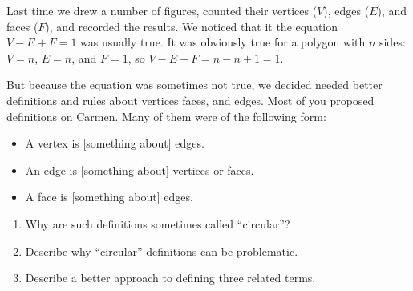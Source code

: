 \documentclass{ximera}
\begin{document}
\begin{question}
Last time we drew a number of figures, counted their vertices ($V$), edges ($E$), and faces ($F$), and recorded the results.  We noticed that it the equation $V-E+F=1$ was usually true.  It was obviously true for a polygon with $n$ sides: $V=n$, $E=n$, and $F=1$, so $V-E+F=n-n+1=1$.  

But because the equation was sometimes not true, we decided needed better definitions and rules about vertices faces, and edges.  Most of you proposed definitions on Carmen.  Many of them were of the following form: 
\begin{itemize}
\item A vertex is [something about] edges. 
\item An edge is [something about] vertices or faces. 
\item A face is [something about] edges. 
\end{itemize}
\begin{enumerate}
\item Why are such definitions sometimes called ``circular''?  
\item Describe why ``circular'' definitions can be problematic. 
\item Describe a better approach to defining three related terms.  
\end{enumerate}
\begin{freeResponse}
\end{freeResponse}
\vfill
\end{question}
\newpage
\end{document}
